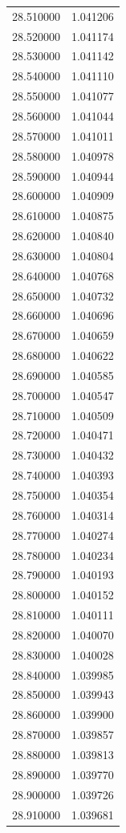 \begin{tabular}{rr}
28.510000 & 1.041206 \\
28.520000 & 1.041174 \\
28.530000 & 1.041142 \\
28.540000 & 1.041110 \\
28.550000 & 1.041077 \\
28.560000 & 1.041044 \\
28.570000 & 1.041011 \\
28.580000 & 1.040978 \\
28.590000 & 1.040944 \\
28.600000 & 1.040909 \\
28.610000 & 1.040875 \\
28.620000 & 1.040840 \\
28.630000 & 1.040804 \\
28.640000 & 1.040768 \\
28.650000 & 1.040732 \\
28.660000 & 1.040696 \\
28.670000 & 1.040659 \\
28.680000 & 1.040622 \\
28.690000 & 1.040585 \\
28.700000 & 1.040547 \\
28.710000 & 1.040509 \\
28.720000 & 1.040471 \\
28.730000 & 1.040432 \\
28.740000 & 1.040393 \\
28.750000 & 1.040354 \\
28.760000 & 1.040314 \\
28.770000 & 1.040274 \\
28.780000 & 1.040234 \\
28.790000 & 1.040193 \\
28.800000 & 1.040152 \\
28.810000 & 1.040111 \\
28.820000 & 1.040070 \\
28.830000 & 1.040028 \\
28.840000 & 1.039985 \\
28.850000 & 1.039943 \\
28.860000 & 1.039900 \\
28.870000 & 1.039857 \\
28.880000 & 1.039813 \\
28.890000 & 1.039770 \\
28.900000 & 1.039726 \\
28.910000 & 1.039681 \\

\end{tabular}
